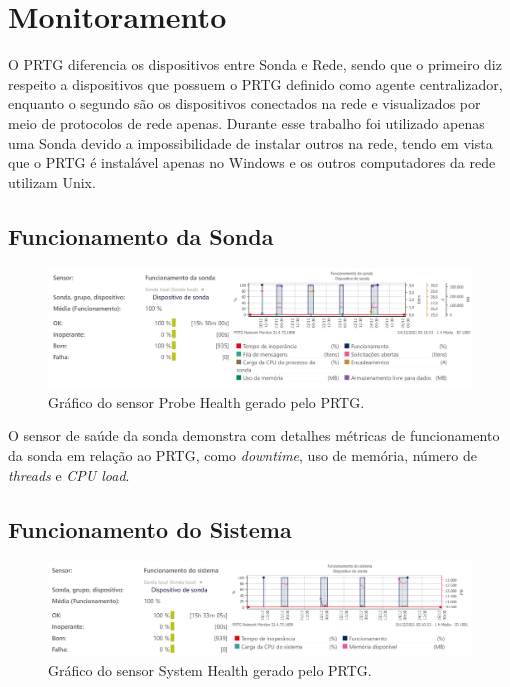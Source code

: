 \documentclass[12pt]{article}
\begin{document}
\section{Monitoramento}

O PRTG diferencia os dispositivos entre Sonda e Rede, sendo que o primeiro diz respeito a dispositivos que possuem o PRTG definido como agente centralizador, enquanto o segundo são os dispositivos conectados na rede e visualizados por meio de protocolos de rede apenas. Durante esse trabalho foi utilizado apenas uma Sonda devido a impossibilidade de instalar outros na rede, tendo em vista que o PRTG é instalável apenas no Windows e os outros computadores da rede utilizam Unix.

\subsection{Funcionamento da Sonda}

\begin{figure}[H]
    \includegraphics[width=\linewidth]{probe_health.png}
    \caption{Gráfico do sensor Probe Health gerado pelo PRTG.}
\end{figure}

O sensor de saúde da sonda demonstra com detalhes métricas de funcionamento da sonda em relação ao PRTG, como \emph{downtime}, uso de memória, número de \emph{threads} e \emph{CPU load}.

\subsection{Funcionamento do Sistema}

\begin{figure}[H]
    \includegraphics[width=\linewidth]{system_health.png}
    \caption{Gráfico do sensor System Health gerado pelo PRTG.}
\end{figure}
\end{document}
